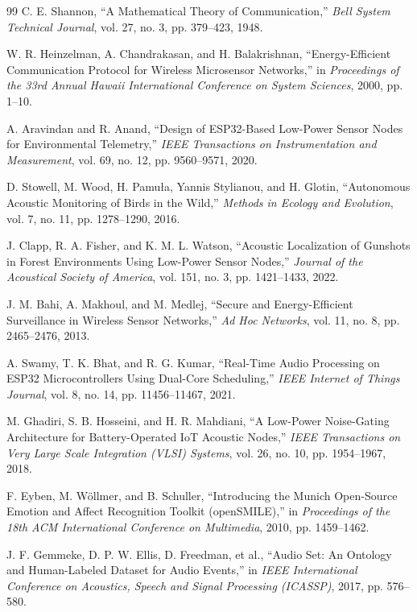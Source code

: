\documentclass[11pt,a4paper,oneside]{report}
\begin{document}
\begin{thebibliography}{99}
C. E. Shannon, ``A Mathematical Theory of Communication,'' \textit{Bell System Technical Journal}, vol. 27, no. 3, pp. 379--423, 1948.

W. R. Heinzelman, A. Chandrakasan, and H. Balakrishnan, ``Energy-Efficient Communication Protocol for Wireless Microsensor Networks,'' in \textit{Proceedings of the 33rd Annual Hawaii International Conference on System Sciences}, 2000, pp. 1--10.

A. Aravindan and R. Anand, ``Design of ESP32-Based Low-Power Sensor Nodes for Environmental Telemetry,'' \textit{IEEE Transactions on Instrumentation and Measurement}, vol. 69, no. 12, pp. 9560--9571, 2020.

D. Stowell, M. Wood, H. Pamu\l{}a, Yannis Stylianou, and H. Glotin, ``Autonomous Acoustic Monitoring of Birds in the Wild,'' \textit{Methods in Ecology and Evolution}, vol. 7, no. 11, pp. 1278--1290, 2016.

J. Clapp, R. A. Fisher, and K. M. L. Watson, ``Acoustic Localization of Gunshots in Forest Environments Using Low-Power Sensor Nodes,'' \textit{Journal of the Acoustical Society of America}, vol. 151, no. 3, pp. 1421--1433, 2022.

J. M. Bahi, A. Makhoul, and M. Medlej, ``Secure and Energy-Efficient Surveillance in Wireless Sensor Networks,'' \textit{Ad Hoc Networks}, vol. 11, no. 8, pp. 2465--2476, 2013.

A. Swamy, T. K. Bhat, and R. G. Kumar, ``Real-Time Audio Processing on ESP32 Microcontrollers Using Dual-Core Scheduling,'' \textit{IEEE Internet of Things Journal}, vol. 8, no. 14, pp. 11456--11467, 2021.

M. Ghadiri, S. B. Hosseini, and H. R. Mahdiani, ``A Low-Power Noise-Gating Architecture for Battery-Operated IoT Acoustic Nodes,'' \textit{IEEE Transactions on Very Large Scale Integration (VLSI) Systems}, vol. 26, no. 10, pp. 1954--1967, 2018.

F. Eyben, M. W\"{o}llmer, and B. Schuller, ``Introducing the Munich Open-Source Emotion and Affect Recognition Toolkit (openSMILE),'' in \textit{Proceedings of the 18th ACM International Conference on Multimedia}, 2010, pp. 1459--1462.

J. F. Gemmeke, D. P. W. Ellis, D. Freedman, et al., ``Audio Set: An Ontology and Human-Labeled Dataset for Audio Events,'' in \textit{IEEE International Conference on Acoustics, Speech and Signal Processing (ICASSP)}, 2017, pp. 576--580.


\end{thebibliography}
\end{document}
